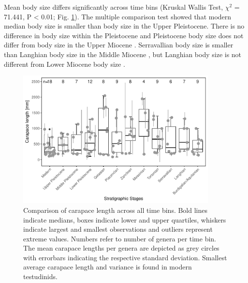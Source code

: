 \FloatBarrier




Mean body size differs significantly across time bins (Kruskal Wallis Test, $\chi^2$ = 71.441, P < 0.01; Fig. \ref{fig:boxBins}). 
The multiple comparison test showed that modern median body size is smaller than body size in the Upper Pleistocene. %
There is no difference in body size within the Pleistocene %
and Pleistocene body size does not differ from body size in the Upper Miocene%
. Serravallian body size is smaller than Langhian body size in the Middle Miocene%
, but Langhian body size is not different from Lower Miocene body size%
.


\begin{figure}[hbtp]
	\centering
	\includegraphics[width=0.9\textwidth]{MA_JJ_files/figure-latex/BPGBins-1.pdf}
	\caption[Comparison of carapace length across time bins]{Comparison of carapace length across all time bins. Bold lines indicate medians, boxes indicate lower and upper quartiles, whiskers indicate largest and smallest observations and outliers represent extreme values. Numbers refer to number of genera per time bin. The mean carapace lengths per genera are depicted as grey circles with errorbars indicating the respective standard deviation. Smallest average carapace length and variance is found in modern testudinids.}
	\label{fig:boxBins}
\end{figure}

